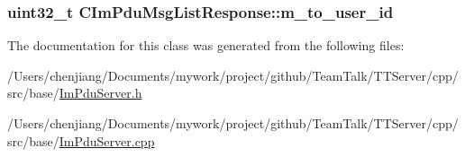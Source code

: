 \subsubsection[{m\+\_\+to\+\_\+user\+\_\+id}]{\setlength{\rightskip}{0pt plus 5cm}uint32\+\_\+t C\+Im\+Pdu\+Msg\+List\+Response\+::m\+\_\+to\+\_\+user\+\_\+id\hspace{0.3cm}{\ttfamily [private]}}\label{class_c_im_pdu_msg_list_response_ab247961d10c2d1a91cfe1c1b174e6709}


The documentation for this class was generated from the following files\+:\begin{DoxyCompactItemize}
\item 
/\+Users/chenjiang/\+Documents/mywork/project/github/\+Team\+Talk/\+T\+T\+Server/cpp/src/base/\hyperlink{_im_pdu_server_8h}{Im\+Pdu\+Server.\+h}\item 
/\+Users/chenjiang/\+Documents/mywork/project/github/\+Team\+Talk/\+T\+T\+Server/cpp/src/base/\hyperlink{_im_pdu_server_8cpp}{Im\+Pdu\+Server.\+cpp}\end{DoxyCompactItemize}
